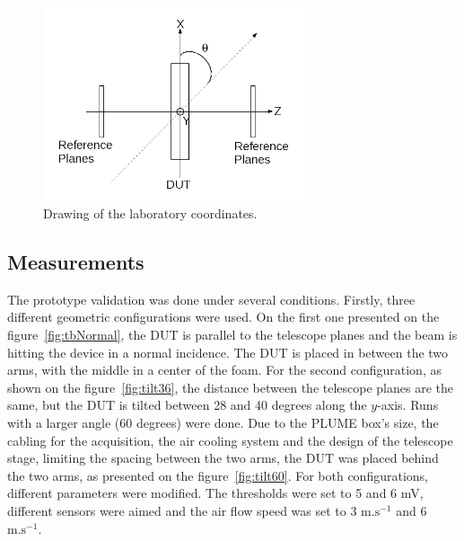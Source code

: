     \begin{figure}
      \centering
      \includegraphics[width = 0.7\textwidth]{Pictures/deformation/lab_frame.png}
      \caption{Drawing of the laboratory coordinates.}
      \label{fig:labCoordinates}
    \end{figure}

    \subsection{Measurements}

    The prototype validation was done under several conditions.
    Firstly, three different geometric configurations were used.
    On the first one presented on the figure~\ref{fig:tbNormal}, the \gls{DUT} is parallel to the telescope planes and the beam is hitting the device in a normal incidence.
    The \gls{DUT} is placed in between the two arms, with the middle in a center of the foam.
    For the second configuration, as shown on the figure~\ref{fig:tilt36}, the distance between the telescope planes are the same, but the \gls{DUT} is tilted between 28 and 40 degrees along the $y$-axis.
    Runs with a larger angle (60 degrees) were done.
    Due to the PLUME box's size, the cabling for the acquisition, the air cooling system and the design of the telescope stage, limiting the spacing between the two arms, the \gls{DUT} was placed behind the two arms, as presented on the figure~\ref{fig:tilt60}.
    For both configurations, different parameters were modified.
    The thresholds were set to 5 and 6 mV, different sensors were aimed and the air flow speed was set to 3 $\text{m.s}^{-1}$ and 6 $\text{m.s}^{-1}$.


